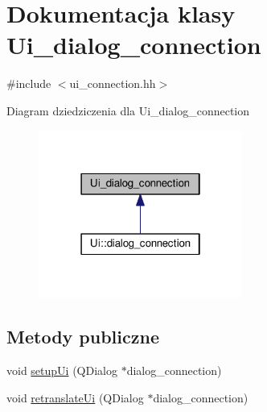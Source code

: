 \hypertarget{class_ui__dialog__connection}{}\section{Dokumentacja klasy Ui\+\_\+dialog\+\_\+connection}
\label{class_ui__dialog__connection}


{\ttfamily \#include $<$ui\+\_\+connection.\+hh$>$}



Diagram dziedziczenia dla Ui\+\_\+dialog\+\_\+connection\nopagebreak
\begin{figure}[H]
\begin{center}
\leavevmode
\includegraphics[width=190pt]{class_ui__dialog__connection__inherit__graph}
\end{center}
\end{figure}
\subsection*{Metody publiczne}
\begin{DoxyCompactItemize}
\item 
void \hyperlink{class_ui__dialog__connection_a05bcadef52b7b92fd9e7d8c7e6388581}{setup\+Ui} (Q\+Dialog $\ast$dialog\+\_\+connection)
\item 
void \hyperlink{class_ui__dialog__connection_a1ee615449de468bc41ee5b49a3547e28}{retranslate\+Ui} (Q\+Dialog $\ast$dialog\+\_\+connection)
\end{DoxyCompactItemize}
